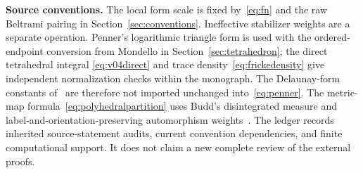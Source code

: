 \noindent\textbf{Source conventions.}
The local form scale is fixed by~\eqref{eq:fn} and the raw Beltrami
pairing in Section~\ref{sec:conventions}. Ineffective stabilizer weights
are a separate operation. Penner's logarithmic triangle form is used
with the ordered-endpoint conversion from Mondello in
Section~\ref{sec:tetrahedron}; the direct tetrahedral integral
\eqref{eq:v04direct} and trace density~\eqref{eq:frickedensity} give
independent normalization checks within the monograph.
The Delaunay-form constants of~\cite[Sections~3.2.3--3.2.4]{CDE}
are therefore not imported unchanged into~\eqref{eq:penner}.
The metric-map formula~\eqref{eq:polyhedralpartition} uses Budd's
disintegrated measure and label-and-orientation-preserving
automorphism weights~\cite[Section~1.1 and Corollary~2]{Budd}.
The ledger  records inherited
source-statement audits, current convention dependencies, and finite
computational support. It does not claim a new complete review of the
external proofs.
\par\endgroup
